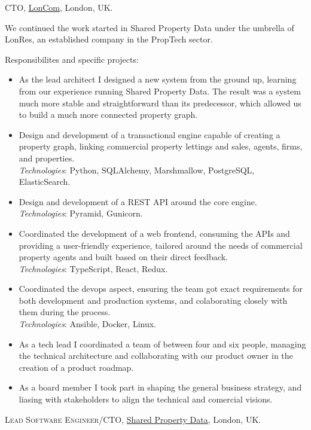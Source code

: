 \documentclass[11pt]{article}
\newcommand{\years}[1]{\marginnote{\scriptsize #1}}
\begin{document}
\years{2017--2018}\textsc{CTO}, \href{http://loncom.com}{LonCom}, London, UK.

We continued the work started in Shared Property Data under the umbrella of LonRes, an established company in the PropTech sector.

Responsibilites and specific projects:
\begin{itemize}
	\item  As the lead architect I designed a new system from the ground up, learning from our experience running Shared Property Data. The result was a system much more stable and straightforward than its predecessor, which allowed us to build a much more connected property graph. 
	\item  Design and development of a transactional engine capable of creating a property graph, linking commercial property lettings and sales, agents, firms, and properties.\\
	\textit{Technologies}: Python, SQLAlchemy, Marshmallow, PostgreSQL, ElasticSearch.
	\item  Design and development of a REST API around the core engine.\\
	\textit{Technologies}: Pyramid, Gunicorn.
	\item  Coordinated the development of a web frontend, consuming the APIs and providing a user-friendly experience, tailored around the needs of commercial property agents and built based on their direct feedback.\\
	\textit{Technologies}: TypeScript, React, Redux.
	\item  Coordinated the devops aspect, ensuring the team got exact requirements for both development and production systems, and colaborating closely with them during the process.\\
	\textit{Technologies}: Ansible, Docker, Linux.
	\item  As a tech lead I coordinated a team of between four and six people, managing the technical architecture and collaborating with our product owner in the creation of a product roadmap.
	\item  As a board member I took part in shaping the general business strategy, and liasing with stakeholders to align the technical and comercial visions.
\end{itemize}

\years{2014--2017}\textsc{Lead Software Engineer/CTO}, \href{http://myspd.co.uk}{Shared Property Data}, London, UK.
\end{document}
